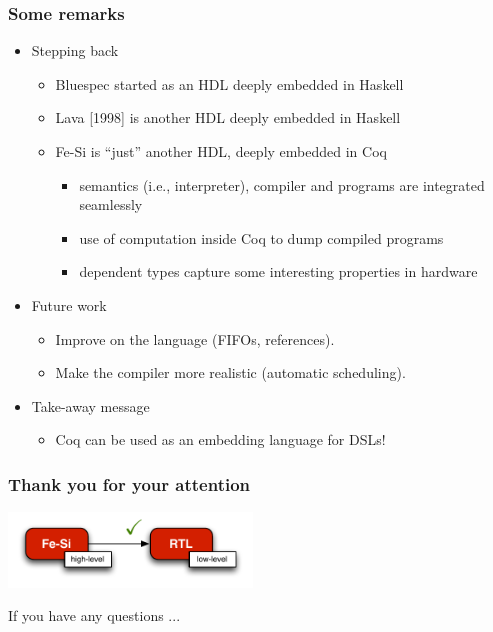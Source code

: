 \documentclass[9pt]{beamer}
\newcommand\fesi{Fe-Si}
\begin{document}
\begin{frame}[fragile]
  \frametitle{Some remarks}
  \begin{itemize}

  \item Stepping back
    \begin{itemize}
    \item Bluespec started as an HDL deeply embedded in Haskell
    \item Lava [1998] is another HDL deeply embedded in Haskell
    \item \fesi{} is ``just'' another HDL,  deeply embedded in \alert{Coq}
      \pause
      \begin{itemize}
      \item semantics (i.e., interpreter), compiler and programs are \alert{integrated seamlessly}
      \item use of computation \alert{inside} Coq to dump compiled programs
      \item dependent types capture some interesting properties in
        hardware
      \end{itemize}
    \end{itemize}

    \pause
    
  \item Future work
    \begin{itemize}
    \item Improve on the language (FIFOs, references).
    \item Make the compiler more realistic (automatic scheduling).
    \end{itemize}
    
    \pause

  \item Take-away message
    \begin{itemize}
    \item Coq can be used as an embedding language for DSLs!
    \end{itemize}
    
  \end{itemize}
\end{frame}

\begin{frame}
  \frametitle{Thank you for your attention}
  
  \begin{center}
    \includegraphics[height= 2cm ]{figs/compilation.pdf}

    \vspace{1cm}

    If you have any questions ... \\
  \end{center}
  
\end{frame}
\end{document}
